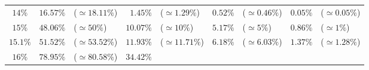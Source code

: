 \documentclass[10pt]{report}
\begin{document}
\begin{exercice}
\begin{center}
\begin{tabular}{|c|rl|rl|rl|rl|}
    
        $14\%$
         & 
    
        $16.57\%$
         & 
    
        ($\simeq18.11\%$)
         & 
    
        $1.45\%$
         & 
    
        ($\simeq1.29\%$)
         & 
    
        $0.52\%$
         & 
    
        ($\simeq0.46\%$)
         & 
    
        $0.05\%$
         & 
    
        ($\simeq0.05\%$)
        
    \\ 

    
        $15\%$
         & 
    
        $48.06\%$
         & 
    
        ($\simeq50\%$)
         & 
    
        $10.07\%$
         & 
    
        ($\simeq10\%$)
         & 
    
        $5.17\%$
         & 
    
        ($\simeq5\%$)
         & 
    
        $0.86\%$
         & 
    
        ($\simeq1\%$)
        
    \\ 

    
        $15.1\%$
         & 
    
        $51.52\%$
         & 
    
        ($\simeq53.52\%$)
         & 
    
        $11.93\%$
         & 
    
        ($\simeq11.71\%$)
         & 
    
        $6.18\%$
         & 
    
        ($\simeq6.03\%$)
         & 
    
        $1.37\%$
         & 
    
        ($\simeq1.28\%$)
        
    \\ 

    
        $16\%$
         & 
    
        $78.95\%$
         & 
    
        ($\simeq80.58\%$)
         & 
    
        $34.42\%$
         & 
    

\end{tabular}
\end{center}
\end{exercice}
\end{document}
